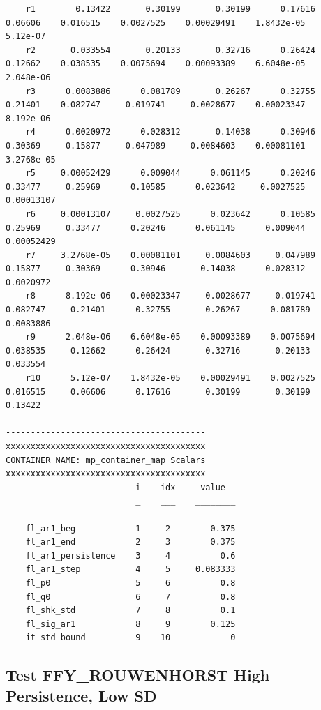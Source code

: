 \documentclass[
]{book}
\begin{document}
\begin{verbatim}
    r1        0.13422       0.30199       0.30199      0.17616     0.06606    0.016515    0.0027525    0.00029491    1.8432e-05      5.12e-07
    r2       0.033554       0.20133       0.32716      0.26424     0.12662    0.038535    0.0075694    0.00093389    6.6048e-05     2.048e-06
    r3      0.0083886      0.081789       0.26267      0.32755     0.21401    0.082747     0.019741     0.0028677    0.00023347     8.192e-06
    r4      0.0020972      0.028312       0.14038      0.30946     0.30369     0.15877     0.047989     0.0084603    0.00081101    3.2768e-05
    r5     0.00052429      0.009044      0.061145      0.20246     0.33477     0.25969      0.10585      0.023642     0.0027525    0.00013107
    r6     0.00013107     0.0027525      0.023642      0.10585     0.25969     0.33477      0.20246      0.061145      0.009044    0.00052429
    r7     3.2768e-05    0.00081101     0.0084603     0.047989     0.15877     0.30369      0.30946       0.14038      0.028312     0.0020972
    r8      8.192e-06    0.00023347     0.0028677     0.019741    0.082747     0.21401      0.32755       0.26267      0.081789     0.0083886
    r9      2.048e-06    6.6048e-05    0.00093389    0.0075694    0.038535     0.12662      0.26424       0.32716       0.20133      0.033554
    r10      5.12e-07    1.8432e-05    0.00029491    0.0027525    0.016515     0.06606      0.17616       0.30199       0.30199       0.13422

----------------------------------------
xxxxxxxxxxxxxxxxxxxxxxxxxxxxxxxxxxxxxxxx
CONTAINER NAME: mp_container_map Scalars
xxxxxxxxxxxxxxxxxxxxxxxxxxxxxxxxxxxxxxxx
                          i    idx     value  
                          _    ___    ________

    fl_ar1_beg            1     2       -0.375
    fl_ar1_end            2     3        0.375
    fl_ar1_persistence    3     4          0.6
    fl_ar1_step           4     5     0.083333
    fl_p0                 5     6          0.8
    fl_q0                 6     7          0.8
    fl_shk_std            7     8          0.1
    fl_sig_ar1            8     9        0.125
    it_std_bound          9    10            0
\end{verbatim}

\hypertarget{test-ffy_rouwenhorst-high-persistence-low-sd}{%
\subsection{Test FFY\_ROUWENHORST High Persistence, Low SD}\label{test-ffy_rouwenhorst-high-persistence-low-sd}}
\end{document}
